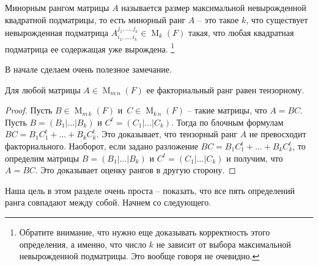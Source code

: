 \begin{definition}
Минорным рангом матрицы $A$ называется размер максимальной невырожденной квадратной подматрицы, то есть минорный ранг $A$ -- это такое $k$, что существует невырожденная подматрица $A_{i_1,\ldots,i_k}^{j_1,\ldots,j_k}\in \operatorname{M}_k(F)$ такая, что любая квадратная подматрица ее содержащая уже вырождена.%
\footnote{Обратите внимание, что нужно еще доказывать корректность этого определения, а именно, что число $k$ не зависит от выбора максимальной невырожденной подматрицы.
Это вообще говоря не очевидно.}
\end{definition}

В начале сделаем очень полезное замечание.

\begin{claim}
\label{claim::rkFactorTensor}
Для любой матрицы $A\in \operatorname{M}_{m\,n}(F)$ ее факториальный ранг равен тензорному.
\end{claim}
\begin{proof}
Пусть $B\in \operatorname{M}_{m\,k}(F)$ и  $\,C\in\operatorname{M}_{k\,n}(F)$ -- такие матрицы, что $A = BC$.
Пусть $B = (B_1|\ldots|B_k)$ и $C^t = (C_1|\ldots|C_k)$.
Тогда по блочным формулам $BC = B_1 C_1^t + \ldots + B_kC_k^t$.
Это доказывает, что тензорный ранг $A$ не превосходит факториального.
Наоборот, если задано разложение $BC = B_1 C_1^t + \ldots + B_kC_k^t$, то определим матрицы $B = (B_1|\ldots|B_k)$ и $C^t = (C_1|\ldots|C_k)$ и получим, что $A = BC$.
Это доказывает оценку рангов в другую сторону.
\end{proof}


Наша цель в этом разделе очень проста -- показать, что все пять определений  ранга совпадают между собой.
Начнем со следующего.

